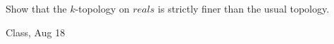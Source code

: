 \begin{samepage}
\begin{ex}
Show that the $k$-topology on $reals$ is strictly finer than the usual topology.
\end{ex}
\begin{source}
Class, Aug 18
\end{source}
\end{samepage}
